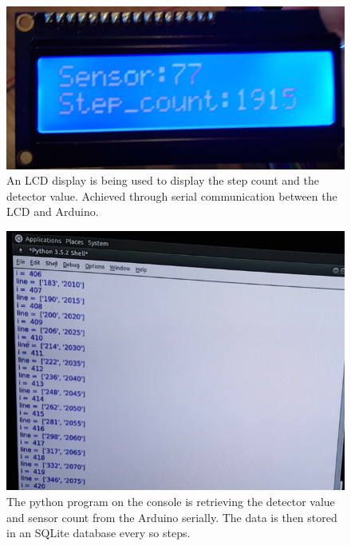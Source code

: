 \documentclass[11pt,a4paper]{book}
\begin{document}
		\begin{figure} [H]
			\centering
			\def\svgwidth{\columnwidth}
			\Huge
			\includegraphics[scale=0.20]{images/chapter-1/detector_real_monitor_lcd_display}
			\caption{An LCD display is being used to display the step count and the detector value. Achieved through serial communication between the LCD and Arduino.}
			\label{fig:detector_real_monitor_lcd_display}
		\end{figure}
	
		\begin{figure} [!ht]
			\centering
			\def\svgwidth{\columnwidth}
			\Huge
			\includegraphics[scale=0.40]{images/chapter-1/data_collection_python_serial}
			\caption{The python program on the console is retrieving the detector value and sensor count from the Arduino serially. The data is then stored in an SQLite database every so steps.}
			\label{fig:data_collection_python_serial}
		\end{figure}	
		
\end{document}
